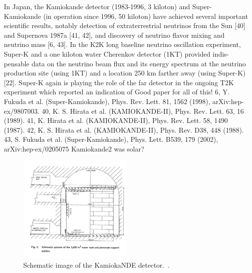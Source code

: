  In Japan, the Kamiokande detector (1983-1996, 3 kiloton) and Super-Kamiokande (in operation since 1996, 50 kiloton) have achieved several important scientific results, notably detection of extraterrestrial neutrinos from the Sun [40] and Supernova 1987a [41, 42], and discovery of neutrino flavor mixing and neutrino mass [6, 43]. In the K2K long baseline neutrino oscillation experiment, Super-K and a one kiloton water Cherenkov detector (1KT) provided indis- pensable data on the neutrino beam flux and its energy spectrum at the neutrino production site (using 1KT) and a location 250 km farther away (using Super-K) [22]. Super-K again is playing the role of the far detector in the ongoing T2K experiment which reported an indication of %
Good paper for all of this! %
6, Y. Fukuda et al. (Super-Kamiokande), Phys. Rev. Lett. 81, 1562 (1998), arXiv:hep-ex/9807003.
40, K. S. Hirata et al. (KAMIOKANDE-II), Phys. Rev. Lett. 63, 16 (1989).
41, K. Hirata et al. (KAMIOKANDE-II), Phys. Rev. Lett. 58, 1490 (1987).
42, K. S. Hirata et al. (KAMIOKANDE-II), Phys. Rev. D38, 448 (1988).
43, S. Fukuda et al. (Super-Kamiokande), Phys. Lett. B539, 179 (2002), arXiv:hep-ex/0205075
Kamiokande2 was solar?
\fi
\begin{figure}[h!]
\centering
  \centering
\includegraphics[width=0.5\textwidth]{figures/Kamioka1.jpeg}
\vspace{2mm}
\caption{Schematic image of the KamiokaNDE detector.~\cite{58KAMIOKA}.}
\label{fig:Kam}
\end{figure}

